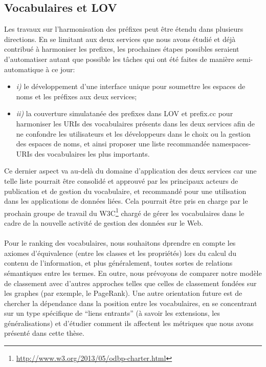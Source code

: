 \documentclass[a4paper,11pt,twoside]{report}
\begin{document}
 
\subsection*{Vocabulaires et LOV}
\label{sec:nextSteps}

Les travaux sur l'harmonisation des préfixes peut être étendu dans plusieurs directions. En se limitant aux deux services que nous avons étudié et déjà contribué à harmoniser les prefixes, les prochaines étapes possibles seraient d'automatiser autant que possible les tâches qui ont été faites de manière semi-automatique à ce jour:

\begin{itemize}
\item \emph{i)}
le développement d'une interface unique pour soumettre les espaces de noms et les préfixes aux deux services;

\item \emph{ii)} 
la couverture simulatanée des prefixes dans LOV et prefix.cc pour harmoniser les URIs des vocabulaires présents dans les deux services afin de ne confondre les utilisateurs et les développeurs dans le choix ou la gestion des espaces de noms, et ainsi proposer une liste recommandée namespaces-URIs des vocabulaires les plus importants.

\end{itemize}  

Ce dernier aspect va au-delà du domaine d'application des deux services car une telle liste pourrait être consolidé et approuvé par les principaux acteurs de publication et de gestion du vocabulaire, et recommandé pour une utilisation dans les applications de données liées. Cela pourrait être pris en charge par le prochain groupe de travail du W3C\footnote{\url{http://www.w3.org/2013/05/odbp-charter.html}} chargé de gérer les vocabulaires dans le cadre de la nouvelle activité de gestion des données sur le Web.


\paragraph{}

Pour le ranking des vocabulaires, nous souhaitons dprendre en compte les axiomes d'équivalence (entre les classes et les propriétés) lors du calcul du contenu de l'information, et plus généralement, toutes sortes de relations sémantiques entre les termes. En outre, nous prévoyons de comparer notre modèle de classement avec d'autres approches telles que celles de classement fondées sur les graphes  (par exemple, le PageRank). Une autre orientation future est de chercher la dépendance dans la position entre les vocabulaires, en se concentrant sur un type spécifique de ``liens entrants'' (à savoir les extensions, les généralisations) et d'étudier comment ils affectent les métriques que nous avons présenté dans cette thèse.
\end{document}
